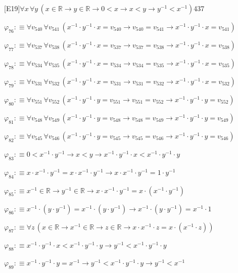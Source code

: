\begin{fullproof}{[E19]}{$\forall x\,\forall y\,(x \in \mathbb{R} \to y \in \mathbb{R} \to 0 < x \to x < y \to y^{-1} < x^{-1})$}{437}
\begin{abbrevlist}
\item $\varphi_{76} :\equiv \forall v_{540}\,\forall v_{541}\,(x^{-1} \cdot y^{-1} \cdot x = v_{540} \to v_{540} = v_{541} \to x^{-1} \cdot y^{-1} \cdot x = v_{541})$
\item $\varphi_{77} :\equiv \forall v_{537}\,\forall v_{538}\,(x^{-1} \cdot y^{-1} \cdot x = v_{537} \to v_{537} = v_{538} \to x^{-1} \cdot y^{-1} \cdot x = v_{538})$
\item $\varphi_{78} :\equiv \forall v_{534}\,\forall v_{535}\,(x^{-1} \cdot y^{-1} \cdot x = v_{534} \to v_{534} = v_{535} \to x^{-1} \cdot y^{-1} \cdot x = v_{535})$
\item $\varphi_{79} :\equiv \forall v_{531}\,\forall v_{532}\,(x^{-1} \cdot y^{-1} \cdot x = v_{531} \to v_{531} = v_{532} \to x^{-1} \cdot y^{-1} \cdot x = v_{532})$
\item $\varphi_{80} :\equiv \forall v_{551}\,\forall v_{552}\,(x^{-1} \cdot y^{-1} \cdot y = v_{551} \to v_{551} = v_{552} \to x^{-1} \cdot y^{-1} \cdot y = v_{552})$
\item $\varphi_{81} :\equiv \forall v_{548}\,\forall v_{549}\,(x^{-1} \cdot y^{-1} \cdot y = v_{548} \to v_{548} = v_{549} \to x^{-1} \cdot y^{-1} \cdot y = v_{549})$
\item $\varphi_{82} :\equiv \forall v_{545}\,\forall v_{546}\,(x^{-1} \cdot y^{-1} \cdot y = v_{545} \to v_{545} = v_{546} \to x^{-1} \cdot y^{-1} \cdot y = v_{546})$
\item $\varphi_{83} :\equiv 0 < x^{-1} \cdot y^{-1} \to x < y \to x^{-1} \cdot y^{-1} \cdot x < x^{-1} \cdot y^{-1} \cdot y$
\item $\varphi_{84} :\equiv x \cdot x^{-1} \cdot y^{-1} = x \cdot x^{-1} \cdot y^{-1} \to x \cdot x^{-1} \cdot y^{-1} = 1 \cdot y^{-1}$
\item $\varphi_{85} :\equiv x^{-1} \in \mathbb{R} \to y^{-1} \in \mathbb{R} \to x \cdot x^{-1} \cdot y^{-1} = x \cdot (x^{-1} \cdot y^{-1})$
\item $\varphi_{86} :\equiv x^{-1} \cdot (y \cdot y^{-1}) = x^{-1} \cdot (y \cdot y^{-1}) \to x^{-1} \cdot (y \cdot y^{-1}) = x^{-1} \cdot 1$
\item $\varphi_{87} :\equiv \forall z\,(x \in \mathbb{R} \to x^{-1} \in \mathbb{R} \to z \in \mathbb{R} \to x \cdot x^{-1} \cdot z = x \cdot (x^{-1} \cdot z))$
\item $\varphi_{88} :\equiv x^{-1} \cdot y^{-1} \cdot x < x^{-1} \cdot y^{-1} \cdot y \to y^{-1} < x^{-1} \cdot y^{-1} \cdot y$
\item $\varphi_{89} :\equiv x^{-1} \cdot y^{-1} \cdot y = x^{-1} \to y^{-1} < x^{-1} \cdot y^{-1} \cdot y \to y^{-1} < x^{-1}$

\end{abbrevlist}
\end{fullproof}
